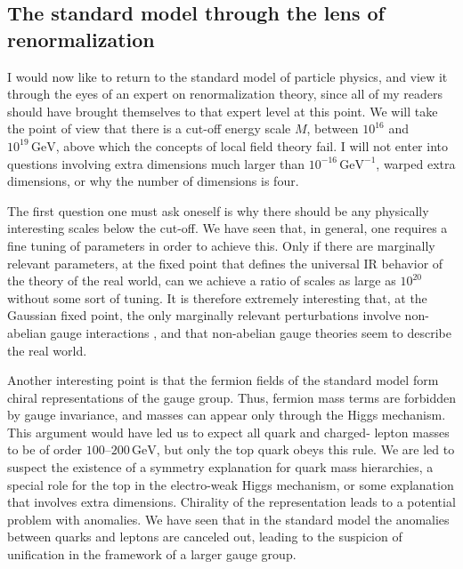 \subsection{The standard model through the lens of renormalization}

I would now like to return to the standard model of particle physics, and view
it through the eyes of an expert on renormalization theory, since all of my
readers should have brought themselves to that expert level at this point. We
will take the point of view that there is a cut-off energy scale $M$, between
$10^{16}$ and $10^{19}\,\mathrm{GeV}$, above which the concepts of local field
theory fail. I will not enter into questions involving extra dimensions much
larger than $10^{-16}\,\mathrm{GeV}^{-1}$, warped extra dimensions, or why the
number of dimensions is four.

The first question one must ask oneself is why there should be any physically
interesting scales below the cut-off. We have seen that, in general, one
requires a fine tuning of parameters in order to achieve this. Only if there
are marginally relevant parameters, at the fixed point that defines the
universal IR behavior of the theory of the real world, can we achieve a ratio of
scales as large as $10^{20}$ without some sort of tuning. It is therefore
extremely interesting that, at the Gaussian fixed point, the only marginally
relevant perturbations involve non-abelian gauge interactions
\cite{banks-ref-120,banks-ref-121,banks-ref-122}, and that non-abelian gauge
theories seem to describe the real world.

Another interesting point is that the fermion fields of the standard model form
chiral representations of the gauge group. Thus, fermion mass terms are
forbidden by gauge invariance, and masses can appear only through the Higgs
mechanism. This argument would have led us to expect all quark and charged-
lepton masses to be of order $100$--$200\,\mathrm{GeV}$, but only the top quark
obeys this rule. We are led to suspect the existence of a symmetry explanation
for quark mass hierarchies, a special role for the top in the electro-weak
Higgs mechanism, or some explanation that involves extra dimensions. Chirality
of the representation leads to a potential problem with anomalies. We have
seen that in the standard model the anomalies between quarks and leptons are
canceled out, leading to the suspicion of unification in the framework of a
larger gauge group.

